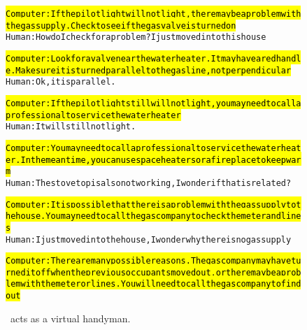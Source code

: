 \begin{figure}[H]
\begin{AIbox}{\DV}
{\begin{alltt}
\hl{Computer: If the pilot light will not light, there may be a problem with the gas supply. Check to see if the gas valve is turned on}\\

Human: How do I check for a problem? I just moved into this house

\hl{Computer: Look for a valve near the water heater. It may have a red handle. Make  sure it is turned parallel to the gas line, not perpendicular
}\\

Human: Ok, it is parallel.

\hl{Computer: If the pilot light still will not light, you may need to call a  professional to service the water heater}\\

Human: It will still not light.

\hl{Computer: You may need to call a professional to service the water heater. In the meantime, you can use space heaters or a fireplace to keep warm}\\

Human: The stovetop is also not working, I wonder if that is related?

\hl{Computer: It is possible that there is a problem with the gas supply to the house. You may need to call the gas company to check the meter and lines
}\\

Human: I just moved into the house, I wonder why there is no gas supply

\hl{Computer: There are many possible reasons. The gas company may have turned it off  when the previous occupants moved out, or there may be a problem with the meter or lines. You will need to call the gas company to find out}
\end{alltt}}\vspace{-6px}
\end{AIbox}
\caption{\DV\ acts as a virtual handyman.}
\label{fig:human_affordance2}
\end{figure}


